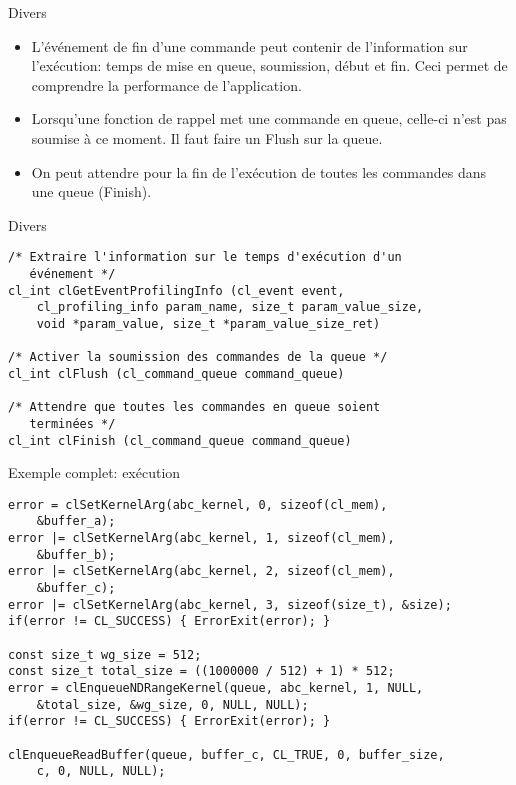 \documentclass[10pt]{beamer}
\begin{document}
\begin{frame}{Divers}

  \begin{itemize}
    \item L'événement de fin d'une commande peut contenir de l'information sur l'exécution: temps de mise en queue, soumission, début et fin. Ceci permet de comprendre la performance de l'application. 

    \item Lorsqu'une fonction de rappel met une commande en queue, celle-ci n'est pas soumise à ce moment. Il faut faire un Flush sur la queue.

    \item On peut attendre pour la fin de l'exécution de toutes les commandes dans une queue (Finish).
  \end{itemize}
\end{frame}

\begin{frame}[fragile]{Divers}

  \scriptsize
  \begin{verbatim}
/* Extraire l'information sur le temps d'exécution d'un
   événement */
cl_int clGetEventProfilingInfo (cl_event event,
    cl_profiling_info param_name, size_t param_value_size,
    void *param_value, size_t *param_value_size_ret)

/* Activer la soumission des commandes de la queue */
cl_int clFlush (cl_command_queue command_queue)

/* Attendre que toutes les commandes en queue soient 
   terminées */
cl_int clFinish (cl_command_queue command_queue)
  \end{verbatim}
\end{frame}

\begin{frame}[fragile]{Exemple complet: exécution}

  \scriptsize
  \begin{verbatim}
error = clSetKernelArg(abc_kernel, 0, sizeof(cl_mem),
    &buffer_a);
error |= clSetKernelArg(abc_kernel, 1, sizeof(cl_mem),
    &buffer_b);
error |= clSetKernelArg(abc_kernel, 2, sizeof(cl_mem), 
    &buffer_c);
error |= clSetKernelArg(abc_kernel, 3, sizeof(size_t), &size);
if(error != CL_SUCCESS) { ErrorExit(error); }

const size_t wg_size = 512;
const size_t total_size = ((1000000 / 512) + 1) * 512;
error = clEnqueueNDRangeKernel(queue, abc_kernel, 1, NULL,
    &total_size, &wg_size, 0, NULL, NULL);
if(error != CL_SUCCESS) { ErrorExit(error); }

clEnqueueReadBuffer(queue, buffer_c, CL_TRUE, 0, buffer_size, 
    c, 0, NULL, NULL);
  \end{verbatim}
\end{frame}
\end{document}
